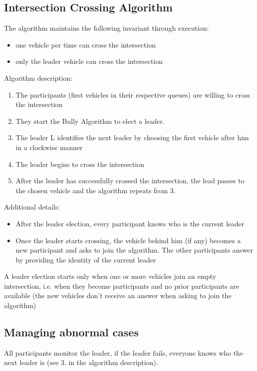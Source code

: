 \documentclass{memoir}
\begin{document}
\subsection{Intersection Crossing Algorithm}

The algorithm maintains the following invariant through execution:

\begin{itemize}
	\item one vehicle per time can cross the intersection
	\item only the leader vehicle can cross the intersection
\end{itemize}
Algorithm description:
\begin{enumerate}
	\item The participants (first vehicles in their respective queues) are willing to cross the intersection
	\item They start the Bully Algorithm to elect a leader.
	\item The leader L identifies the next leader by choosing the first vehicle after him in a clockwise manner
	\item The leader begins to cross the intersection
	\item After the leader has successfully crossed the intersection, the lead passes to the chosen vehicle and the algorithm repeats from 3.
\end{enumerate}
Additional details:
\begin{itemize}
	\item After the leader election, every participant knows who is the current leader
	\item Once the leader starts crossing, the vehicle behind him (if any) becomes a new participant and asks to join the algorithm. The other participants answer by providing the identity of the current leader
\end{itemize}
A leader election starts only when one or more vehicles join an empty intersection, i.e. when they become participants and no prior participants are available (the new vehicles don't receive an answer when asking to join the algorithm)

\subsection{Managing abnormal cases}

All participants monitor the leader, if the leader fails, everyone knows who the next leader is (see 3. in the algorithm description).
\end{document}
